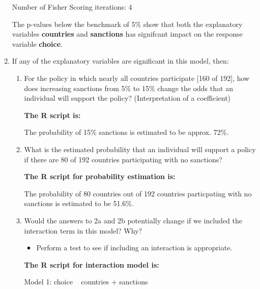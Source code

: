 \documentclass[12pt,letterpaper]{article}
\begin{document}
\begin{enumerate}
Number of Fisher Scoring iterations: 4

The p-values below the benchmark of 5\% show that both the explanatory variables \textbf{countries} and \textbf{sanctions} has signifcant impact on the response variable \textbf{choice}.


\vspace{.8cm}

	\item If any of the explanatory variables are significant in this model, then:
	\begin{enumerate}
		\item
		For the policy in which nearly all countries participate [160 of 192], how does increasing sanctions from 5\% to 15\% change the odds that an individual will support the policy? (Interpretation of a coefficient)
\vspace{.5cm}
	
		\textbf{		The R script is:}
		 
		
		The probability of 15\% sanctions is estimated to be approx. 72\%.
		\newpage
		\item
		What is the estimated probability that an individual will support a policy if there are 80 of 192 countries participating with no sanctions? 
		
		\textbf{		The R script for probability estimation is:}
		 
		
		The probability of 80 countries out of 192 countries particpating with no sanctions is estimated to be 51.6\%.
		\vspace{.5cm}
		\item
		Would the answers to 2a and 2b potentially change if we included the interaction term in this model? Why? 
		\begin{itemize}
			\item Perform a test to see if including an interaction is appropriate.
		\end{itemize}
		\vspace{.5cm}
			\textbf{		The R script for interaction model is:}
		 
		
		Model 1: choice ~ countries + sanctions
		

\end{enumerate}
\end{enumerate}
\end{document}
